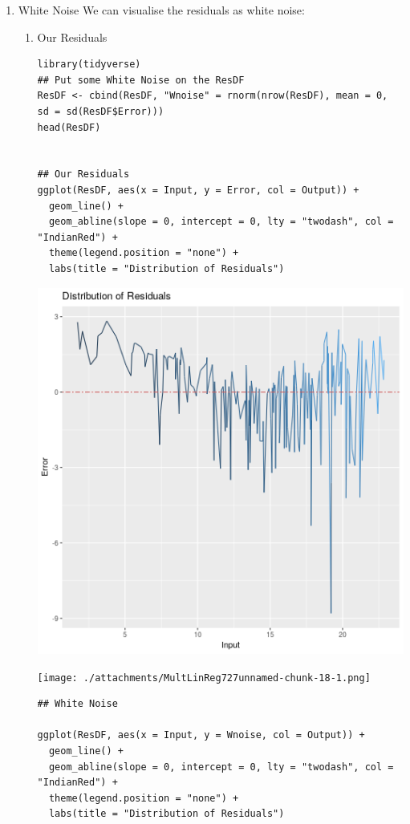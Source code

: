 \documentclass[11pt]{article}
\begin{document}
\begin{enumerate}
\begin{enumerate}
\item White Noise
\label{sec:orgcb26af2}
We can visualise the residuals as white noise:

\begin{enumerate}
\item Our Residuals
\label{sec:org855cc29}
\begin{verbatim}
library(tidyverse)
## Put some White Noise on the ResDF
ResDF <- cbind(ResDF, "Wnoise" = rnorm(nrow(ResDF), mean = 0, sd = sd(ResDF$Error)))
head(ResDF)


## Our Residuals
ggplot(ResDF, aes(x = Input, y = Error, col = Output)) +
  geom_line() +
  geom_abline(slope = 0, intercept = 0, lty = "twodash", col = "IndianRed") +
  theme(legend.position = "none") + 
  labs(title = "Distribution of Residuals")
\end{verbatim}

\begin{center}
\includegraphics[width=.9\linewidth]{aljas.png}
\end{center}

\begin{center}
\texttt{[image: ./attachments/MultLinReg727unnamed-chunk-18-1.png]}
\end{center}

\begin{verbatim}
## White Noise

ggplot(ResDF, aes(x = Input, y = Wnoise, col = Output)) +
  geom_line() +
  geom_abline(slope = 0, intercept = 0, lty = "twodash", col = "IndianRed") +
  theme(legend.position = "none") + 
  labs(title = "Distribution of Residuals")
\end{verbatim}


\end{enumerate}
\end{enumerate}
\end{enumerate}
\end{document}
